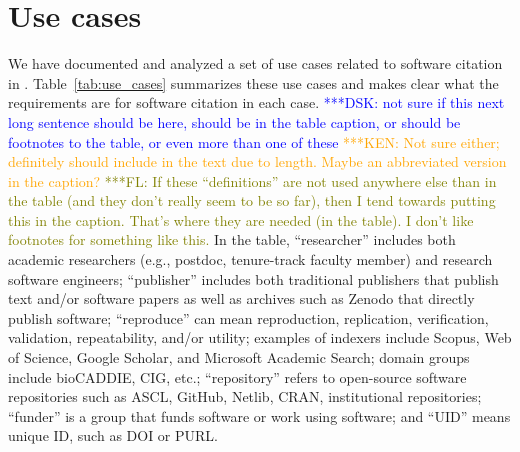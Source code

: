 \documentclass[11pt, oneside]{amsart}
\newcommand{\katznote}[1]{ {\textcolor{blue} { ***DSK: #1 }}}
\newcommand{\niemnote}[1]{ {\textcolor{orange} { ***KEN: #1 }}}
\newcommand{\flnote}[1]{ {\textcolor{olive} { ***FL: #1 }}}
\begin{document}
\section{Use cases}
\label{sec:use_cases}

We have documented and analyzed a set of use cases related to software citation in \cite{SC-Use-Cases}.
Table~\ref{tab:use_cases} summarizes these use cases and makes clear what the requirements are for software citation in each case.
\katznote{not sure if this next long sentence should be here, should be in the table caption, or should be footnotes to the table, or even more than one of these}
\niemnote{Not sure either; definitely should include in the text due to length. Maybe an abbreviated version in the caption?}\flnote{If these ``definitions'' are not used anywhere else than in the table (and they don't really seem to be so far), then I tend towards putting this in the caption. That's where they are needed (in the table). I don't like footnotes for something like this.}
In the table,
``researcher'' includes both academic researchers (e.g., postdoc, tenure-track faculty member) and research software engineers;
``publisher'' includes both traditional publishers that publish text and\slash or software papers as well as archives such as Zenodo that directly publish software;
``reproduce'' can mean reproduction, replication, verification, validation, repeatability, and\slash or utility;
examples of indexers include Scopus, Web of Science, Google Scholar, and Microsoft Academic Search;
domain groups include bioCADDIE, CIG, etc.;
``repository'' refers to open-source software repositories such as ASCL, GitHub, Netlib, CRAN, institutional repositories;
``funder'' is a group that funds software or work using software; and
``UID'' means unique ID, such as DOI or PURL.
\end{document}
